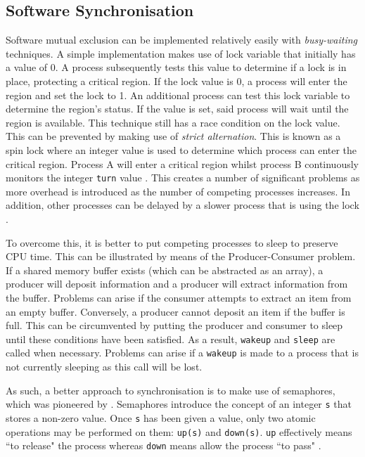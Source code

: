 \documentclass[12pt,a4paper,oneside]{article}
\def\code#1{\texttt{#1}}
\begin{document}
\begin{spacing}{1.4}
\subsection{Software Synchronisation}
Software mutual exclusion can be implemented relatively easily with \textit{busy-waiting} techniques. A simple implementation makes use of lock variable that initially has a value of 0. A process subsequently tests this value to determine if a lock is in place, protecting a critical region. If the lock value is 0, a process will enter the region and set the lock to 1. An additional process can test this lock variable to determine the region's status. If the value is set, said process will wait until the region is available. This technique still has a race condition on the lock value. This can be prevented by making use of \textit{strict alternation}. This is known as a spin lock where an integer value is used to determine which process can enter the critical region. Process A will enter a critical region whilst process B continuously monitors the integer \code{turn} value \citep{modernOS}. This creates a number of significant problems as more overhead is introduced as the number of competing processes increases. In addition, other processes can be delayed by a slower process that is using the lock \citep{spinlocks1994}.

To overcome this, it is better to put competing processes to sleep to preserve CPU time. This can be illustrated by means of the Producer-Consumer problem. If a shared memory buffer exists (which can be abstracted as an array), a producer will deposit information and a producer will extract information from the buffer. Problems can arise if the consumer attempts to extract an item from an empty buffer. Conversely, a producer cannot deposit an item if the buffer is full. This can be circumvented by putting the producer and consumer to sleep until these conditions have been satisfied. As a result, \code{wakeup} and \code{sleep} are called when necessary. Problems can arise if a \code{wakeup} is made to a process that is not currently sleeping as this call will be lost.

As such, a better approach to synchronisation is to make use of semaphores, which was pioneered by \cite{dijkstraSems}. Semaphores introduce the concept of an integer \code{s} that stores a non-zero value. Once \code{s} has been given a value, only two atomic operations may be performed on them: \code{up(s)} and \code{down(s)}. \code{up} effectively means ``to release" the process whereas \code{down} means allow the process ``to pass" \citep{trainBook}. 
\end{spacing}
\end{document}
